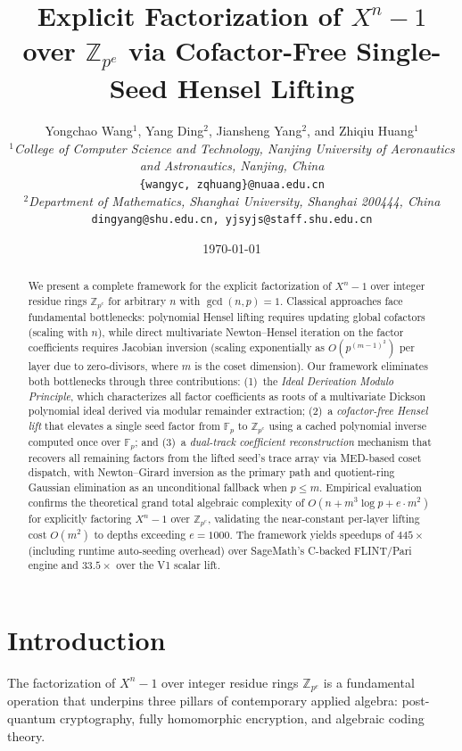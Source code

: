 \documentclass[12pt]{article}
\title{\textbf{Explicit Factorization of $X^n-1$ over $\mathbb{Z}_{p^e}$ via Cofactor-Free Single-Seed Hensel Lifting}}
\author{
    Yongchao Wang$^{1}$, Yang Ding$^{2}$, Jiansheng Yang$^{2}$, and Zhiqiu Huang$^{1}$ \\[0.5em]
    $^{1}$\textit{College of Computer Science and Technology, Nanjing University of Aeronautics and Astronautics, Nanjing, China} \\
    \texttt{\{wangyc, zqhuang\}@nuaa.edu.cn} \\[0.5em]
    $^{2}$\textit{Department of Mathematics, Shanghai University, Shanghai 200444, China} \\
    \texttt{dingyang@shu.edu.cn, yjsyjs@staff.shu.edu.cn}
}
\date{\today}
\theoremstyle{plain}
\begin{document}
\maketitle

\begin{abstract}
We present a complete framework for the explicit factorization of $X^n-1$ over integer residue rings $\mathbb{Z}_{p^e}$ for arbitrary $n$ with $\gcd(n, p)=1$. Classical approaches face fundamental bottlenecks: polynomial Hensel lifting requires updating global cofactors (scaling with $n$), while direct multivariate Newton--Hensel iteration on the factor coefficients requires Jacobian inversion (scaling exponentially as $O(p^{(m-1)^2})$ per layer due to zero-divisors, where $m$ is the coset dimension). Our framework eliminates both bottlenecks through three contributions: (1)~the \emph{Ideal Derivation Modulo Principle}, which characterizes all factor coefficients as roots of a multivariate Dickson polynomial ideal derived via modular remainder extraction; (2)~a \emph{cofactor-free Hensel lift} that elevates a single seed factor from $\mathbb{F}_p$ to $\mathbb{Z}_{p^e}$ using a cached polynomial inverse computed once over $\mathbb{F}_p$; and (3)~a \emph{dual-track coefficient reconstruction} mechanism that recovers all remaining factors from the lifted seed's trace array via MED-based coset dispatch, with Newton--Girard inversion as the primary path and quotient-ring Gaussian elimination as an unconditional fallback when $p \leq m$. Empirical evaluation confirms the theoretical grand total algebraic complexity of $O(n + m^3 \log p + e \cdot m^2)$ for explicitly factoring $X^n-1$ over $\mathbb{Z}_{p^e}$, validating the near-constant per-layer lifting cost $O(m^2)$ to depths exceeding $e = 1000$. The framework yields speedups of $445\times$ (including runtime auto-seeding overhead) over SageMath's C-backed FLINT/Pari engine and $33.5\times$ over the V1 scalar lift.
\end{abstract}

\section{Introduction}

The factorization of $X^n-1$ over integer residue rings $\mathbb{Z}_{p^e}$ is a fundamental operation that underpins three pillars of contemporary applied algebra: post-quantum cryptography, fully homomorphic encryption, and algebraic coding theory.
\end{document}
